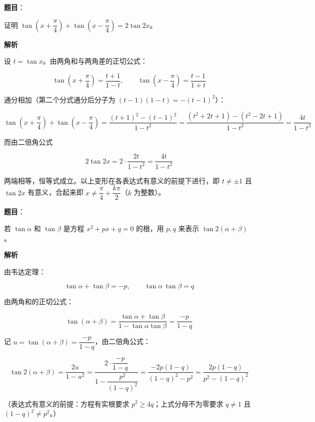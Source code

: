 \begin{answer}

\textbf{题目}：

证明 $\tan\left(x+\dfrac\pi4\right)+\tan\left(x-\dfrac\pi4\right)=2\tan 2x$。

\textbf{解析}

设 $t=\tan x$。由两角和与两角差的正切公式：

\nopagebreak[4]
\[
\tan\left(x+\frac\pi4\right)=\frac{t+1}{1-t},\qquad
\tan\left(x-\frac\pi4\right)=\frac{t-1}{1+t}
\]

通分相加（第二个分式通分后分子为 $(t-1)(1-t)=-(t-1)^2$）：

\nopagebreak[4]
\[
\tan\left(x+\frac\pi4\right)+\tan\left(x-\frac\pi4\right)
=\frac{(t+1)^2-(t-1)^2}{1-t^2}
=\frac{(t^2+2t+1)-(t^2-2t+1)}{1-t^2}
=\frac{4t}{1-t^2}
\]

而由二倍角公式

\nopagebreak[4]
\[
2\tan 2x=2\cdot\frac{2t}{1-t^2}=\frac{4t}{1-t^2}
\]

两端相等，恒等式成立。以上变形在各表达式有意义的前提下进行，即 $t\neq\pm 1$ 且 $\tan 2x$ 有意义，合起来即 $x\neq\dfrac\pi4+\dfrac{k\pi}{2}$（$k$ 为整数）。


\end{answer}
\begin{answer}

\textbf{题目}：

若 $\tan\alpha$ 和 $\tan\beta$ 是方程 $x^2+px+q=0$ 的根，用 $p,q$ 来表示 $\tan 2(\alpha+\beta)$。

\textbf{解析}

由韦达定理：

\nopagebreak[4]
\[
\tan\alpha+\tan\beta=-p,\qquad \tan\alpha\,\tan\beta=q
\]

由两角和的正切公式：

\nopagebreak[4]
\[
\tan(\alpha+\beta)=\frac{\tan\alpha+\tan\beta}{1-\tan\alpha\tan\beta}
=\frac{-p}{1-q}
\]

记 $u=\tan(\alpha+\beta)=\dfrac{-p}{1-q}$，由二倍角公式：

\nopagebreak[4]
\[
\tan 2(\alpha+\beta)=\frac{2u}{1-u^2}
=\frac{2\cdot\dfrac{-p}{1-q}}{1-\dfrac{p^2}{(1-q)^2}}
=\frac{-2p(1-q)}{(1-q)^2-p^2}
=\frac{2p(1-q)}{p^2-(1-q)^2}
\]

（表达式有意义的前提：方程有实根要求 $p^2\ge 4q$；上式分母不为零要求 $q\neq 1$ 且 $(1-q)^2\neq p^2$。）


\end{answer}
